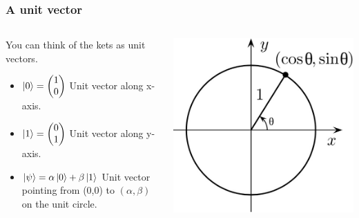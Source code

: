 \documentclass[10pt]{beamer}
\begin{document}
\begin{frame}
  \frametitle{A unit vector}
  \begin{columns}
    \begin{column}{0.5\linewidth}
      You can think of the kets as unit vectors.
      \begin{itemize}
      \item $\ket{0} =
        \begin{pmatrix}
          1 \\0 
        \end{pmatrix}$ Unit vector along x-axis.
      \item $\ket{1} =
        \begin{pmatrix}
         0 \\ 1 
        \end{pmatrix}$ Unit vector along y-axis.
      \item $\ket{\psi}=\alpha \ket{0}+\beta \ket{1}$ Unit vector pointing from (0,0) to $(\alpha , \beta)$ on the unit circle.
      \end{itemize}
    \end{column}
    \begin{column}{0.49\linewidth}
      \includegraphics[width=\linewidth]{img/unit-circle.jpg}
    \end{column}
  \end{columns}
\end{frame}
\end{document}
